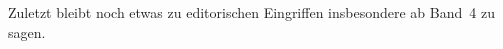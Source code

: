 Zuletzt bleibt noch etwas zu editorischen Eingriffen insbesondere ab
Band~4\nocite{cao4} zu sagen.
%
%
% 

